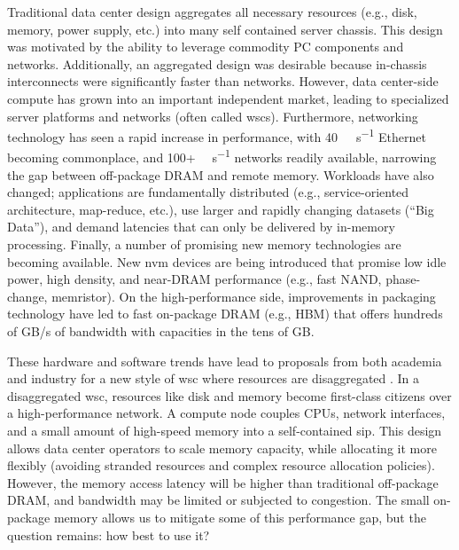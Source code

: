 Traditional data center design aggregates all necessary resources (e.g., disk,
memory, power supply, etc.) into many self contained server chassis. This
design was motivated by the ability to leverage commodity PC components and
networks\cite{NOW}. Additionally, an aggregated design was desirable because
in-chassis interconnects were significantly faster than networks. However, data
center-side compute has grown into an important independent market, leading to
specialized server platforms and networks (often called \glspl{wsc}).
Furthermore, networking technology has seen a rapid increase in performance,
with \SI{40}{\giga\bit\per\second} Ethernet becoming commonplace, and 100+
\si{\giga\bit\per\second} networks readily available, narrowing the gap between
off-package DRAM and remote memory.  Workloads have also changed; applications
are fundamentally distributed (e.g., service-oriented architecture, map-reduce,
etc.), use larger and rapidly changing datasets (``Big Data''), and demand
latencies that can only be delivered by in-memory processing. Finally, a number
of promising new memory technologies are becoming available. New \gls{nvm}
devices are being introduced that promise low idle power, high density, and
near-DRAM performance (e.g., fast NAND, phase-change, memristor). On the
high-performance side, improvements in packaging technology have led to fast
on-package DRAM (e.g., HBM) that offers hundreds of GB/s of bandwidth with
capacities in the tens of GB.

These hardware and software trends have lead to proposals from both
academia\cite{firebox}\cite{dredbox} and
industry\cite{themachine}\cite{huaweidc30}\cite{intelrsa}\cite{fbdisag} for a
new style of \gls{wsc} where resources are disaggregated . In a
disaggregated \gls{wsc}, resources like disk and memory become first-class
citizens over a high-performance network. A compute node couples CPUs, network
interfaces, and a small amount of high-speed memory into a self-contained
\gls{sip}. This design allows data center operators to scale memory capacity,
while allocating it more flexibly (avoiding stranded resources and complex
resource allocation policies). However, the memory access latency will be
higher than traditional off-package DRAM, and bandwidth may be limited or
subjected to congestion. The small on-package memory allows us to mitigate some
of this performance gap, but the question remains: how best to use it?

